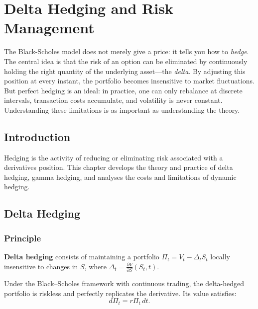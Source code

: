 \chapter{Delta Hedging and Risk Management}
\label{ch:hedging}

The Black-Scholes model does not merely give a price: it tells you how to \emph{hedge}. The central idea is that the risk of an option can be eliminated by continuously holding the right quantity of the underlying asset---the \emph{delta}. By adjusting this position at every instant, the portfolio becomes insensitive to market fluctuations. But perfect hedging is an ideal: in practice, one can only rebalance at discrete intervals, transaction costs accumulate, and volatility is never constant. Understanding these limitations is as important as understanding the theory.

\section{Introduction}

Hedging is the activity of reducing or eliminating risk associated with a
derivatives position. This chapter develops the theory and practice of
delta hedging, gamma hedging, and analyses the costs and limitations of
dynamic hedging.

\section{Delta Hedging}

\subsection{Principle}

\begin{definition}
\textbf{Delta hedging} consists of maintaining a portfolio
$\Pi_t = V_t - \Delta_t S_t$
locally insensitive to changes in $S$, where
$\Delta_t = \frac{\partial V}{\partial S}(S_t, t)$.
\end{definition}

\begin{theorem}
Under the Black--Scholes framework with continuous trading, the delta-hedged
portfolio is riskless and perfectly replicates the derivative. Its value
satisfies:
\[
    d\Pi_t = r\Pi_t\,dt.
\]
\end{theorem}

